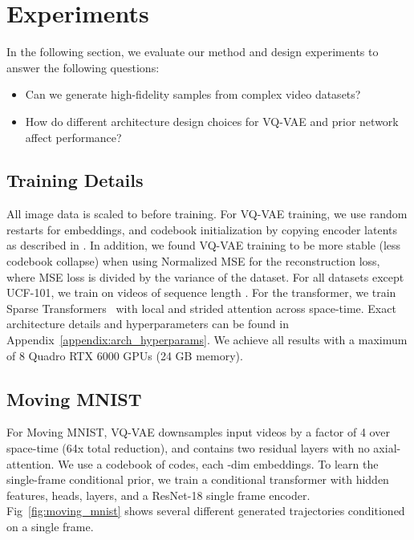 
\section{Experiments}

In the following section, we evaluate our method and design experiments to answer the following questions:
\begin{itemize}
    \item Can we generate high-fidelity samples from complex video datasets?
    \item How do different architecture design choices for VQ-VAE and prior network affect performance?
\end{itemize}


\subsection{Training Details}
All image data is scaled to  before training. For VQ-VAE training, we use random restarts for embeddings, and codebook initialization by copying encoder latents as described in \cite{dhariwal2020jukebox}. In addition, we found VQ-VAE training to be more stable (less codebook collapse) when using Normalized MSE for the reconstruction loss, where MSE loss is divided by the variance of the dataset. For all datasets except UCF-101, we train on  videos of sequence length . For the transformer, we train Sparse Transformers~\cite{child2019generating} with local and strided attention across space-time. Exact architecture details and hyperparameters can be found in Appendix~\ref{appendix:arch_hyperparams}. We achieve all results with a maximum of 8 Quadro RTX 6000 GPUs (24 GB memory). 


\subsection{Moving MNIST}
For Moving MNIST, VQ-VAE downsamples input videos by a factor of 4 over space-time (64x total reduction), and contains two residual layers with no axial-attention. We use a codebook of  codes, each -dim embeddings. To learn the single-frame conditional prior, we train a conditional transformer with  hidden features,  heads,  layers, and a ResNet-18 single frame encoder. Fig~\ref{fig:moving_mnist} shows several different generated trajectories conditioned on a single frame.

